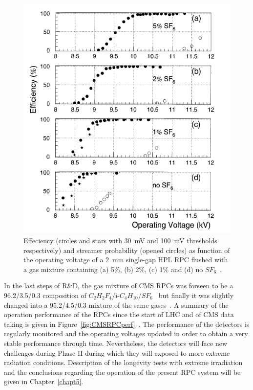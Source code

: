 	\begin{figure}[H]
		\centering
		\includegraphics[width = 0.7\plotwidth]{fig/chapt4/SF6.png}
		\caption{\label{fig:SF6} Effeciency (circles and stars with \SI{30}{mV} and \SI{100}{mV} thresholds respectively) and streamer probability (opened circles) as function of the operating voltatge of a \SI{2}{mm} single-gap HPL RPC flushed with a gas mixture containing (a) 5\%, (b) 2\%, (c) 1\% and (d) no $SF_6$~\cite{CAMARRI98}.}
	\end{figure}
	
	In the last steps of R\&D, the gas mixture of CMS RPCs was forseen to be a 96.2/3.5/0.3 composition of $C_2H_2F_4$/i-$C_4H_{10}$/$SF_6$~\cite{ABBRESCIA2005} but finally it was slightly changed into a 95.2/4.5/0.3 mixture of the same gases~\cite{THYSSEN2012}. A summary of the operation performance of the RPCs since the start of LHC and of CMS data taking is given in Figure~\ref{fig:CMSRPCperf}~\cite{SHAH2018}. The performance of the detectors is regularly monitored and the operating voltages updated in order to obtain a very stable performance through time. Nevertheless, the detectors will face new challenges during Phase-II during which they will exposed to more extreme radiation conditions. Description of the longevity tests with extreme irradiation and the conclusions regarding the operation of the present RPC system will be given in Chapter~\ref{chapt5}.
	
